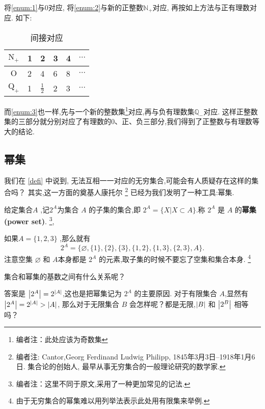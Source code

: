 \documentclass[UTF8]{mathrep}
\begin{document}
将\cref{enum:1}与$0$对应,
将\cref{enum:2}与新的正整数$\mathbb N_+$对应,
再按如上方法与正有理数对应.
如下:

\begin{table}[h!]
	\begin{center}
		\begin{tabular}{c|lllll}
			\toprule
			$\mathrm N_+$ & 1 & 2             & 3 & 4 & $\cdots$ \\
			\midrule
			$\mathrm O$   & 2 & 4             & 6 & 8 & $\cdots$ \\
			\midrule
			$\mathrm Q_+$ & 1 & $\frac{1}{2}$ & 2 & 3 & $\cdots$ \\
			\bottomrule
		\end{tabular}
		\caption{间接对应}
	\end{center}
\end{table}

而\cref{enum:3}也一样,先与一个新的整数集\footnote{编者注：此处应该为奇数集}对应,再与负有理数集$\mathbb Q_-$对应.
这样正整数集的三部分就分别对应了有理数的$0$、正、负三部分,我们得到了正整数与有理数等大的结论.


\subsection{幂集}
\label{ssec:powerset}
我们在 \cref{defi} 中说到,
无法互相一一对应的无穷集合,可能会有人质疑存在这样的集合吗？
其实,这一方面的奠基人康托尔
\footnote{编者注: Cantor,Georg Ferdinand Ludwig Philipp,
	1845年3月3日--1918年1月6日.
	集合论的创始人, 最早从事无穷集合的一般理论研究的数学家.}
已经为我们发明了一种工具:幂集.

\begin{definition}
	给定集合$A$ ,记$2^{A}$为集合 $A$  的子集的集合,即 $2^{A}=\{ X|X\subset A \}$.称 $2^{A}$ 是 $A$ 的\textbf{幂集(power set)}.
	\footnote{编者注：这里不同于原文,采用了一种更加常见的记法.},
\end{definition}

如果$A=\{1,2,3\}$ ,那么就有
\[
	2^A=\{\varnothing, \{1\}, \{2\}, \{3\}, \{1,2\}, \{1,3\}, \{2,3\}, A\}
	.\]
注意空集 $\varnothing$ 和 $A$本身都是 $2^{A}$ 的元素,取子集的时候不要忘了空集和集合本身.
\footnote{由于无穷集合的幂集难以用列举法表示此处用有限集来举例.}

集合和幂集的基数之间有什么关系呢？

答案是 $\left\lvert 2^A \right\rvert =2^{ \left\lvert A \right\rvert }$,这也是把幂集记为 $2^A$ 的主要原因.
对于有限集合 $A$,显然有 $\left\lvert 2^A \right\rvert =2^{ \left\lvert A \right\rvert }> \left\lvert A \right\rvert$,
那么对于无限集合 $B$ 会怎样呢？都是无限,$\left\lvert B \right\rvert$ 和 $\left\lvert 2^B \right\rvert$ 相等吗？
\end{document}
